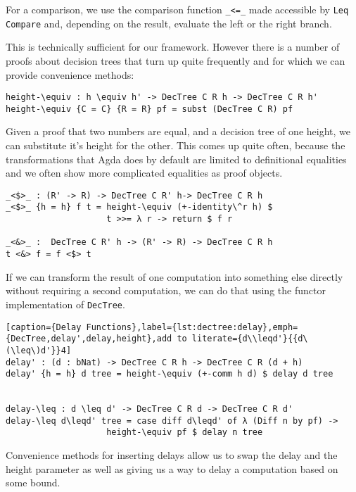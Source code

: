 For a comparison, we use the comparison function \texttt{\_<=\_} made accessible by \texttt{Leq Compare} and, depending on the result, evaluate the left or the right branch.


This is technically sufficient for our framework. However there is a number of proofs about decision trees that turn up quite frequently and for which we can provide convenience methods:

\begin{lstlisting}[caption={Height Substitution},label={lst:dectree:height-equiv},emph={height,DecTree}]
height-\equiv : h \equiv h' -> DecTree C R h -> DecTree C R h'
height-\equiv {C = C} {R = R} pf = subst (DecTree C R) pf
\end{lstlisting}

Given a proof that two numbers are equal, and a decision tree of one height, we can substitute it's height for the other. This comes up quite often, because the transformations that Agda does by default are limited to definitional equalities and we often show more complicated equalities as proof objects.

\begin{lstlisting}[caption={Functor Implementation for DecTree},label={lst:dectree:functor},emph={DecTree,return,height}]
_<$>_ : (R' -> R) -> DecTree C R' h-> DecTree C R h
_<$>_ {h = h} f t = height-\equiv (+-identity\^r h) $
                    t >>= λ r -> return $ f r

_<&>_ :  DecTree C R' h -> (R' -> R) -> DecTree C R h
t <&> f = f <$> t
\end{lstlisting}

If we can transform the result of one computation into something else directly without requiring a second computation, we can do that using the functor implementation of \texttt{DecTree}.

\begin{lstlisting}[caption={Delay Functions},label={lst:dectree:delay},emph={DecTree,delay',delay,height},add to literate={d\\leqd'}{{d\(\leq\)d'}}4]
delay' : (d : bNat) -> DecTree C R h -> DecTree C R (d + h)
delay' {h = h} d tree = height-\equiv (+-comm h d) $ delay d tree


delay-\leq : d \leq d' -> DecTree C R d -> DecTree C R d'
delay-\leq d\leqd' tree = case diff d\leqd' of λ (Diff n by pf) ->
                    height-\equiv pf $ delay n tree
\end{lstlisting}

Convenience methods for inserting delays allow us to swap the delay and the height parameter as well as giving us a way to delay a computation based on some bound.

